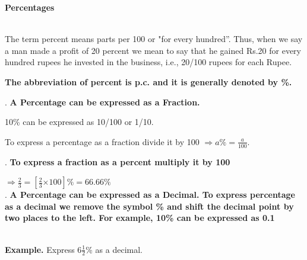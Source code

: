 \documentclass{article}
\begin{document}
\noindent 

\noindent \begin{center}
	{\LARGE \textbf{Percentages \\}}
\end{center}




\noindent 

\noindent 

\noindent 

\noindent \\ The term percent means parts per 100 or "for every hundred''. Thus, when we say a man made a profit of 20 percent we mean to say that he gained Rs.20 for every hundred rupees he invested in the business, i.e., 20/100 rupees for each Rupee. \\

\noindent 

\noindent 

\noindent \textbf{The abbreviation of percent is p.c. and it is generally denoted by \%. \\}

\noindent 

\noindent 

\noindent 

.   \textbf{A Percentage can be expressed as a Fraction.}

10\% can be expressed as 10/100 or 1/10.

To express a percentage as a fraction divide it by 100 $\mathrm{\Rightarrow } a\% = \frac{a}{100}$. \\

\noindent 

\noindent 

\noindent 

.   \textbf{To express a fraction as a percent multiply it by 100}



 $\mathrm{\Rightarrow } \frac{2}{3} = [\frac{2}{3} \mathrm{\times} 100 ]\% = 66.66\%$ \\


.   \textbf{A Percentage can be expressed as a Decimal. To express percentage as a decimal we remove the symbol \% and shift the decimal point by two places to the left. For example, 10\% can be expressed as 0.1}

\noindent \\ \textbf{Example. }Express $ 6 \frac{1}{2}$\% as a decimal.
\end{document}
